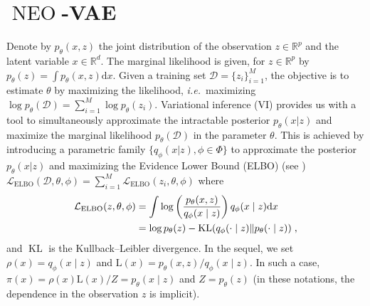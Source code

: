 \documentclass{article}
\def\IFIS{\ensuremath{\operatorname{NEO}}}
\def\rmd{\operatorname{d}\hspace{-2pt}}
\def\rset{\mathbb{R}}
\def\rmd{\mathrm{d}}
\def\eqsp{\,}
\def\ie{\textit{i.e.}}
\def\eqsp{\;}
\newcommand{\1}{\mathds{1}}
\def\target{\pi}
\def\proposal{\rho}
\def\const{Z}
\def\rset{\mathbb{R}}
\def\rmd{\mathrm{d}}
\def\likelihood{\mathrm{L}}
\def\obs{z}
\begin{document}
\section{\IFIS-VAE}
\label{sec:NEO-VAE}

\def\Uset{\mathsf{U}}
Denote by $p_\theta(x,\obs)$ the joint distribution of the observation $\obs \in \rset^p$  and the latent variable $x \in \rset^d$. The marginal likelihood is given, for $\obs \in \rset^p$ by $p_\theta(\obs)= \int p_\theta(x,\obs) \rmd x$. Given a training set $\mathcal{D}= \{ \obs_i \}_{i=1}^M$, the objective is to estimate $\theta$ by maximizing the likelihood, \ie\ maximizing $\log p_\theta(\mathcal{D}) = \sum_{i=1}^M \log p_\theta(\obs_i)$. 
Variational inference (VI)
provides us with a tool to simultaneously approximate the intractable
posterior $p_\theta(x|\obs)$ and maximize the marginal likelihood
$p_\theta(\mathcal{D})$ in the parameter $\theta$. This is achieved by introducing a
 parametric family  $\{ q_\phi(x|\obs), \phi \in \Phi\}$ to approximate the posterior $p_\theta(x|\obs)$ and maximizing
the Evidence Lower Bound (ELBO) (see \cite{kingma2019introduction}) $\mathcal{L}_{\operatorname{ELBO}}(\mathcal{D},\theta,\phi)= \sum_{i=1}^M \mathcal{L}_{\operatorname{ELBO}}(\obs_i,\theta,\phi)$ where
\begin{align}
\label{eq:elbo}
\mathcal{L}_{\textup{ELBO}}(\obs,\theta,\phi)&= \int \log\left(\frac{p_\theta(x,\obs)}{q_\phi(x\mid \obs)}\right) q_\phi(x\mid \obs)\rmd x \eqsp\\
&=\log p_\theta(\obs)-\operatorname{KL}(q_\phi(\cdot\mid \obs) \| p_\theta(\cdot\mid \obs) )\eqsp,\nonumber
\end{align}
and $\operatorname{KL}$ is the Kullback–Leibler divergence. 
In the sequel, we set  $\proposal(x)=q_\phi(x\mid \obs)$ and $\likelihood(x)= p_\theta(x,\obs)/ q_\phi(x \mid \obs)$. In such a case,  $\target(x)= \proposal(x) \likelihood(x)/ \const= p_{\theta}(x\mid \obs)$ and  $\const= p_\theta(\obs)$ (in these notations, the dependence in the observation $\obs$ is implicit).
\end{document}
